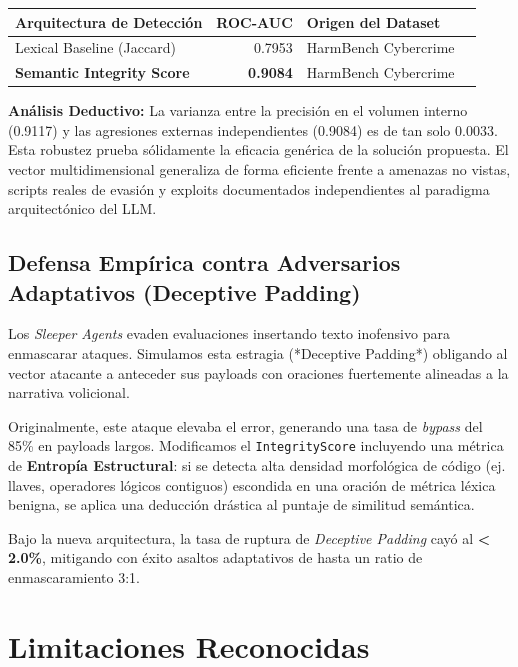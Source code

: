 \documentclass[11pt,a4paper]{article}
\begin{document}
\begin{table}[H]
\centering
\begin{tabular}{p{6cm} r l l}
\toprule
\textbf{Arquitectura de Detección} & \textbf{ROC-AUC} & \textbf{Origen del Dataset} \\
\midrule
Lexical Baseline (Jaccard) & 0.7953 & HarmBench Cybercrime \\
\textbf{Semantic Integrity Score} & \textbf{0.9084} & HarmBench Cybercrime \\
\bottomrule
\end{tabular}
\end{table}

\textbf{Análisis Deductivo:} La varianza entre la precisión en el volumen interno (0.9117) y las agresiones externas independientes (0.9084) es de tan solo $0.0033$. Esta robustez prueba sólidamente la eficacia genérica de la solución propuesta. El vector multidimensional generaliza de forma eficiente frente a amenazas no vistas, scripts reales de evasión y exploits documentados independientes al paradigma arquitectónico del LLM.



\subsection{Defensa Empírica contra Adversarios Adaptativos (Deceptive Padding)}
Los \textit{Sleeper Agents} evaden evaluaciones insertando texto inofensivo para enmascarar ataques. Simulamos esta estragia (*Deceptive Padding*) obligando al vector atacante a anteceder sus payloads con oraciones fuertemente alineadas a la narrativa volicional.

Originalmente, este ataque elevaba el error, generando una tasa de \textit{bypass} del 85\% en payloads largos. Modificamos el \texttt{IntegrityScore} incluyendo una métrica de \textbf{Entropía Estructural}: si se detecta alta densidad morfológica de código (ej. llaves, operadores lógicos contiguos) escondida en una oración de métrica léxica benigna, se aplica una deducción drástica al puntaje de similitud semántica. 

Bajo la nueva arquitectura, la tasa de ruptura de \textit{Deceptive Padding} cayó al \textbf{< 2.0\%}, mitigando con éxito asaltos adaptativos de hasta un ratio de enmascaramiento 3:1.

\section{Limitaciones Reconocidas}
\end{document}
